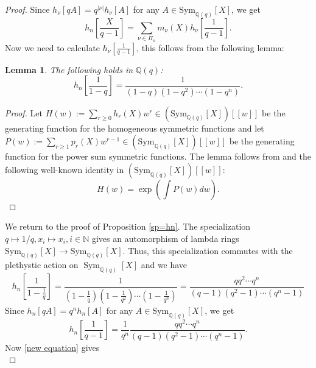 \documentclass{amsart}
\theoremstyle{plain}
\newtheorem{lemma}[theorem]{Lemma}
\theoremstyle{definition}
\theoremstyle{remark}
\DeclareMathOperator{\Sym}{Sym}
\begin{document}
\begin{proof}
Since $h_{\nu}[qA]=q^{|\nu|}h_{\nu}[A]$ for any $A\in\text{Sym}_{\mathbb{Q}(q)}[X]$, we get
\begin{equation}\label{new equation}
h_{n}\left[\frac{X}{q-1}\right]
=
\sum_{\nu\in\Pi_{n}}m_{\nu}(X)h_{\nu}\left[\frac{1}{q-1}\right].
\end{equation}
Now we need to calculate $h_{\nu}\left[\frac{1}{q-1}\right]$, this follows from the following lemma:
\begin{lemma}\label{hnq}
The following holds in $\mathbb{Q}(q)$:
\[
{h_{n}\left[\frac{1}{1-q}\right]=\frac{1}{(1-q)(1-q^2)\cdots(1-q^n)}}.
\]
\end{lemma}
\begin{proof}
Let $H(w):=\sum_{r\geq 0}h_{r}(X)w^{r}\in(\text{Sym}_{\mathbb{Q}(q)}[X])[[w]]$ be the generating function for the homogeneous symmetric functions and let $P(w):=\sum_{r\geq 1}p_{r}(X)w^{r-1}\in(\text{Sym}_{\mathbb{Q}(q)}[X])[[w]]$ be the generating function for the power sum symmetric functions. The lemma follows from \cite[Chapter I, Section 2, Example 4]{Mac} and the following well-known identity in $(\text{Sym}_{\mathbb{Q}(q)}[X])[[w]]$:
\[
H(w)=\exp\left(\int P(w)dw\right).
\]
\end{proof}
We return to the proof of Proposition \ref{sp=hn}. The specialization $q\mapsto 1/q, x_{i}\mapsto x_{i}, i\in\mathbb{N}$ gives an automorphism of lambda rings $\text{Sym}_{\mathbb{Q}(q)}[X]\rightarrow\text{Sym}_{\mathbb{Q}(q)}[X]$. Thus, this specialization commutes with the plethystic action on $\Sym_{\mathbb{Q}(q)}[X]$ and we have
\[
h_{n}\left[\frac{1}{1-\frac{1}{q}}\right]=\frac{1}{(1-\frac{1}{q})(1-\frac{1}{q^2})\cdots(1-\frac{1}{q^n})}
=
\frac{q q^2\cdots q^n}{(q-1)(q^2-1)\cdots(q^n-1)}
\]
Since $h_n[qA]=q^nh_{n}[A]$ for any $A\in\text{Sym}_{\mathbb{Q}(q)}[X]$, we get
\[
h_{n}\left[\frac{1}{q-1}\right]=\frac{1}{q^n}\frac{q q^2\cdots q^n}{(q-1)(q^2-1)\cdots(q^n-1)}.
\]
Now \eqref{new equation} gives
\begin{equation}\label{5}

\end{equation}
\end{proof}
\end{document}
